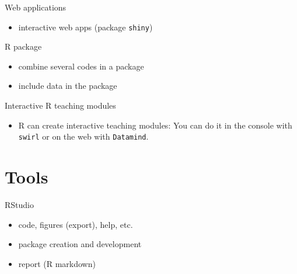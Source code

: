 \documentclass[8pt,ignorenonframetext,]{beamer}
\providecommand{\tightlist}{%
  \setlength{\itemsep}{0pt}\setlength{\parskip}{0pt}}
\begin{document}
\begin{frame}[fragile]{Web applications}

\begin{itemize}
\tightlist
\item
  interactive web apps (package \texttt{shiny})
\end{itemize}

\end{frame}

\begin{frame}{R package}

\begin{itemize}
\tightlist
\item
  combine several codes in a package
\item
  include data in the package
\end{itemize}

\end{frame}

\begin{frame}[fragile]{Interactive R teaching modules}

\begin{itemize}
\tightlist
\item
  R can create interactive teaching modules: You can do it in the
  console with \texttt{swirl} or on the web with \texttt{Datamind}.
\end{itemize}

\end{frame}

\section{Tools}\label{tools}

\begin{frame}{RStudio}

\begin{itemize}
\tightlist
\item
  code, figures (export), help, etc.
\item
  package creation and development
\item
  report (R markdown)
\end{itemize}

\end{frame}
\end{document}
